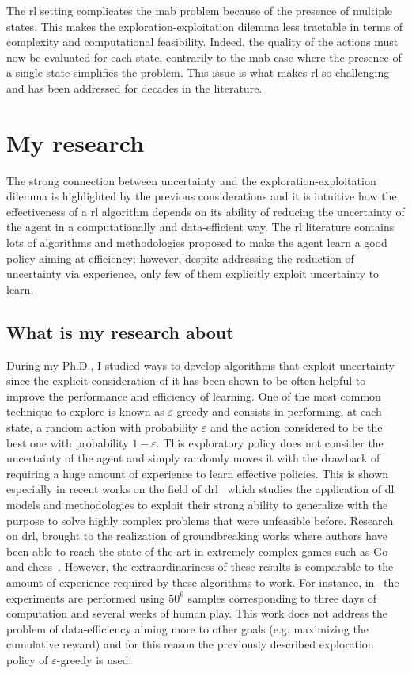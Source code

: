 The \gls{rl} setting complicates the \gls{mab} problem because of the presence of multiple states. This makes the exploration-exploitation dilemma less tractable in terms of complexity and computational feasibility. Indeed, the quality of the actions must now be evaluated for each state, contrarily to the \gls{mab} case where the presence of a single state simplifies the problem. This issue is what makes \gls{rl} so challenging and has been addressed for decades in the literature.

\section{My research}
The strong connection between uncertainty and the exploration-exploitation dilemma is highlighted by the previous considerations and it is intuitive how the effectiveness of a \gls{rl} algorithm depends on its ability of reducing the uncertainty of the agent in a computationally and data-efficient way. The \gls{rl} literature contains lots of algorithms and methodologies proposed to make the agent learn a good policy aiming at efficiency; however, despite addressing the reduction of uncertainty via experience, only few of them explicitly exploit uncertainty to learn.

\subsection{What is my research about}
During my Ph.D., I studied ways to develop algorithms that exploit uncertainty since the explicit consideration of it has been shown to be often helpful to improve the performance and efficiency of learning. One of the most common technique to explore is known as $\varepsilon$-greedy and consists in performing, at each state, a random action with probability $\varepsilon$ and the action considered to be the best one with probability $1 - \varepsilon$. This exploratory policy does not consider the uncertainty of the agent and simply randomly moves it with the drawback of requiring a huge amount of experience to learn effective policies. This is shown especially in recent works on the field of \gls{drl}~\cite{mnih2015human, van2016deep, wang2015dueling} which studies the application of \gls{dl}~\cite{lecun2015deep} models and methodologies to exploit their strong ability to generalize with the purpose to solve highly complex problems that were unfeasible before. Research on \gls{drl}, brought to the realization of groundbreaking works where authors have been able to reach the state-of-the-art in extremely complex games such as Go~\cite{silver2016mastering, silver2017mastering} and chess~\cite{silver2017chess}.
However, the extraordinariness of these results is comparable to the amount of experience required by these algorithms to work. For instance, in~\cite{mnih2015human} the experiments are performed using $50^6$ samples corresponding to three days of computation and several weeks of human play. This work does not address the problem of data-efficiency aiming more to other goals (e.g. maximizing the cumulative reward) and for this reason the previously described exploration policy of $\varepsilon$-greedy is used.

